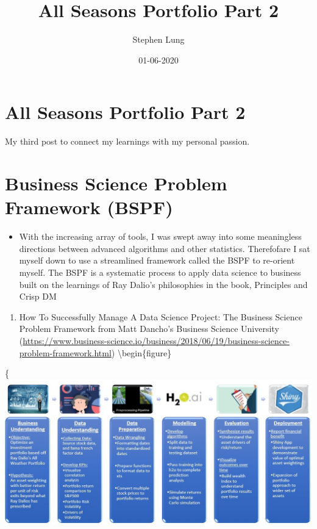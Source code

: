 \documentclass[
]{article}
\title{All Seasons Portfolio Part 2}
\author{Stephen Lung}
\date{01-06-2020}
\providecommand{\tightlist}{%
  \setlength{\itemsep}{0pt}\setlength{\parskip}{0pt}}
\begin{document}
\maketitle

\hypertarget{all-seasons-portfolio-part-2}{%
\section{All Seasons Portfolio Part
2}\label{all-seasons-portfolio-part-2}}

My third post to connect my learnings with my personal passion.

\hypertarget{business-science-problem-framework-bspf}{%
\section{Business Science Problem Framework
(BSPF)}\label{business-science-problem-framework-bspf}}

\begin{itemize}
\tightlist
\item
  With the increasing array of tools, I was swept away into some
  meaningless directions between advanced algorithms and other
  statistics. Therefofare I sat myself down to use a streamlined
  framework called the BSPF to re-orient myself. The BSPF is a
  systematic process to apply data science to business built on the
  learnings of Ray Dalio's philosophies in the book, Principles and
  Crisp DM
\end{itemize}

\begin{enumerate}
\def\labelenumi{\arabic{enumi}.}
\tightlist
\item
  How To Successfully Manage A Data Science Project: The Business
  Science Problem Framework from Matt Dancho's Business Science
  University
  (\url{https://www.business-science.io/business/2018/06/19/business-science-problem-framework.html})
  \textbackslash begin\{figure\}
\end{enumerate}

\{\centering \includegraphics[width=1000px]{Images/Business Science Framework - V2}
\end{document}
